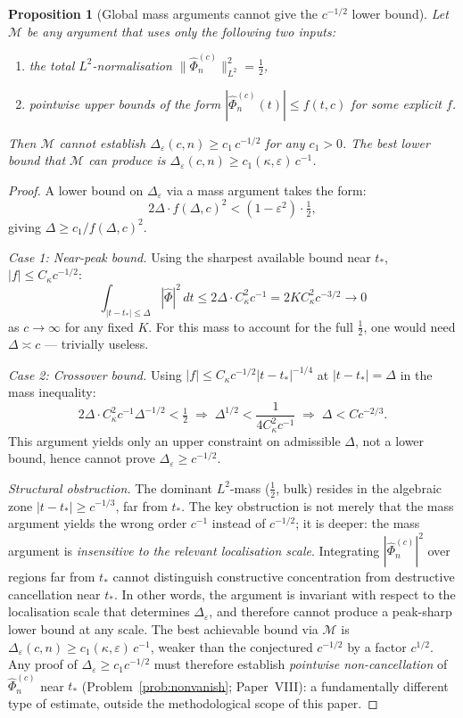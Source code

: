 \documentclass[12pt,a4paper]{amsart}
\newtheorem{proposition}[theorem]{Proposition}
\theoremstyle{definition}
\theoremstyle{remark}
\begin{document}
\begin{proposition}[Global mass arguments
cannot give the $c^{-1/2}$ lower bound]
\label{prop:lower-barrier}
Let $\mathcal{M}$ be any argument that uses
only the following two inputs:
\begin{enumerate}[\rm(a)]
\item the total $L^2$-normalisation
$\|\widehat{\Phi}_n^{(c)}\|_{L^2}^2
= \tfrac{1}{2}$,
\item pointwise upper bounds of the form
$|\widehat{\Phi}_n^{(c)}(t)|
\le f(t,c)$ for some explicit $f$.
\end{enumerate}
Then $\mathcal{M}$ cannot establish
$\Delta_\varepsilon(c,n) \ge c_1\,c^{-1/2}$
for any $c_1 > 0$.
The best lower bound that $\mathcal{M}$
can produce is
$\Delta_\varepsilon(c,n) \ge c_1({\kappa,\varepsilon})\,c^{-1}$.
\end{proposition}

\begin{proof}
A lower bound on $\Delta_\varepsilon$
via a mass argument takes the form:
\[
2\Delta \cdot f(\Delta, c)^2
< (1-\varepsilon^2) \cdot \tfrac{1}{2},
\]
giving $\Delta \ge c_1/f(\Delta,c)^2$.

\textit{Case 1: Near-peak bound.}
Using the sharpest available bound near $t_*$,
$|f| \le C_\kappa c^{-1/2}$:
\[
\int_{|t-t_*|\le\Delta}|\widehat{\Phi}|^2\,dt
\le 2\Delta \cdot C_\kappa^2 c^{-1}
= 2KC_\kappa^2 c^{-3/2} \to 0
\]
as $c \to \infty$ for any fixed $K$.
For this mass to account for the full $\tfrac12$,
one would need $\Delta \asymp c$ --- trivially useless.

\textit{Case 2: Crossover bound.}
Using $|f| \le C_\kappa c^{-1/2}|t-t_*|^{-1/4}$
at $|t-t_*|=\Delta$ in the mass inequality:
\[
2\Delta \cdot C_\kappa^2 c^{-1}\Delta^{-1/2} < \tfrac12
\;\Longrightarrow\;
\Delta^{1/2} < \frac{1}{4C_\kappa^2 c^{-1}}
\;\Longrightarrow\;
\Delta < C c^{-2/3}.
\]
This argument yields only an upper constraint
on admissible $\Delta$, not a lower bound,
hence cannot prove $\Delta_\varepsilon \ge c^{-1/2}$.

\textit{Structural obstruction.}
The dominant $L^2$-mass ($\tfrac{1}{2}$, bulk)
resides in the algebraic zone $|t - t_*| \ge c^{-1/3}$,
far from $t_*$.
The key obstruction is not merely that the mass argument
yields the wrong order $c^{-1}$ instead of $c^{-1/2}$;
it is deeper: the mass argument is
\emph{insensitive to the relevant localisation scale}.
Integrating $|\widehat{\Phi}_n^{(c)}|^2$ over regions
far from $t_*$ cannot distinguish constructive
concentration from destructive cancellation near $t_*$.
In other words, the argument is invariant with respect
to the localisation scale that determines
$\Delta_\varepsilon$, and therefore cannot produce
a peak-sharp lower bound at any scale.
The best achievable bound via $\mathcal{M}$ is
$\Delta_\varepsilon(c,n) \ge c_1(\kappa,\varepsilon)\,c^{-1}$,
weaker than the conjectured $c^{-1/2}$ by a factor $c^{1/2}$.
Any proof of $\Delta_\varepsilon \ge c_1 c^{-1/2}$
must therefore establish
\emph{pointwise non-cancellation} of
$\widehat{\Phi}_n^{(c)}$ near $t_*$
(Problem~\ref{prob:nonvanish}; Paper~VIII):
a fundamentally different type of estimate,
outside the methodological scope of this paper.
\end{proof}
\end{document}
